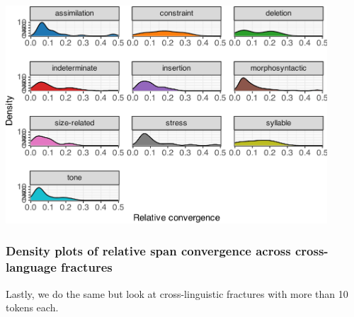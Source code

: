 \documentclass[
]{article}
\begin{document}
\begin{center}\includegraphics[width=0.9\textwidth,height=\textheight]{02_analyses_chapter17_files/figure-latex/dens pw-1} \end{center}

\subsubsection{Density plots of relative span convergence across
cross-language
fractures}\label{density-plots-of-relative-span-convergence-across-cross-language-fractures}

Lastly, we do the same but look at cross-linguistic fractures with more
than 10 tokens each.
\end{document}

